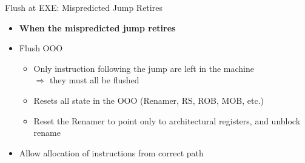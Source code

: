 \documentclass[aspectratio=169,12pt]{beamer}
\begin{document}
\begin{frame}{Flush at EXE: Mispredicted Jump Retires}
    \centering
    \vspace{1cm}

    
    \vspace{0.5cm}
    \begin{itemize}
        \item[] \textbf{When the mispredicted jump retires}
        \item Flush OOO
        \begin{itemize}
            \item Only instruction following the jump are left in the machine \\
            $\Rightarrow$ they must all be flushed
            \item Resets all state in the OOO (Renamer, RS, ROB, MOB, etc.)
            \item Reset the Renamer to point only to architectural registers, and unblock rename
        \end{itemize}
        \item Allow allocation of instructions from correct path
    \end{itemize}
\end{frame}
\end{document}
